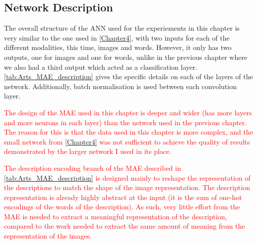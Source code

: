 \subsection{Network Description}
The overall structure of the \ac{ANN} used for the experiements in this chapter is very similar to the one used in \autoref{Chapter4}, with two inputs for each of the different modalities, this time, images and words. However, it only has two outputs, one for images and one for words, unlike in the previous chapter where we also had a third output which acted as a classification layer. \autoref{tab:Arts_MAE_description}  gives the specific details on each of the layers of the network. Additionally, batch normalisation is used between each convolution layer.

\textcolor{red}{The design of the \ac{MAE} used in this chapter is deeper and wider (has more layers and more neurons in each layer) than the network used in the previous chapter. The reason for this is that the data used in this chapter is more complex, and the small network from \autoref{Chapter4} was not sufficient to achieve the quality of results demonstrated by the larger network I used in its place.}

\textcolor{red}{The description encoding branch of the \ac{MAE} described in \autoref{tab:Arts_MAE_description} is designed mainly to reshape the representation of the descriptions to match the shape of the image representation. The description representation is already highly abstract at the input (it is the sum of one-hot encodings of the words of the description). As such, very little effort from the \ac{MAE} is needed to extract a meaningful representation of the description, compared to the work needed to extract the same amount of meaning from the representation of the images.}

